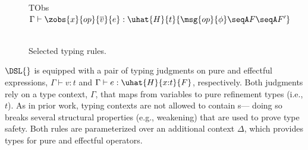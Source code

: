 \begin{figure}[!t]
{\quad
{}
{TObs}
{
  $\Gamma\vdash \zobs{x}{op}{\overline{v}}{e} : \uhat{H}{t}{\msg{op}{\phi} \seqA F \seqA F'}$
}
\\[.8em]
\
\
}
\vspace*{-.1in}
\caption{Selected typing rules.}
\label{fig:selected-typing-rules}
\vspace*{-.15in}
\end{figure}

$\DSL{}$ is equipped with a pair of typing judgments on pure and
effectful expressions, $\Gamma \vdash v : t$ and
$\Gamma\vdash e: \uhat{H}{x{:}t}{F}$, respectively. Both judgments
rely on a type context, $\Gamma$, that maps from variables to pure
refinement types (i.e., $t$). As in prior work, typing contexts are
not allowed to contain \tyName{}s--- doing so breaks several
structural properties (e.g., weakening) that are used to prove type
safety. Both rules are parameterized over an additional context
$\Delta$, which provides types for pure and effectful operators.

